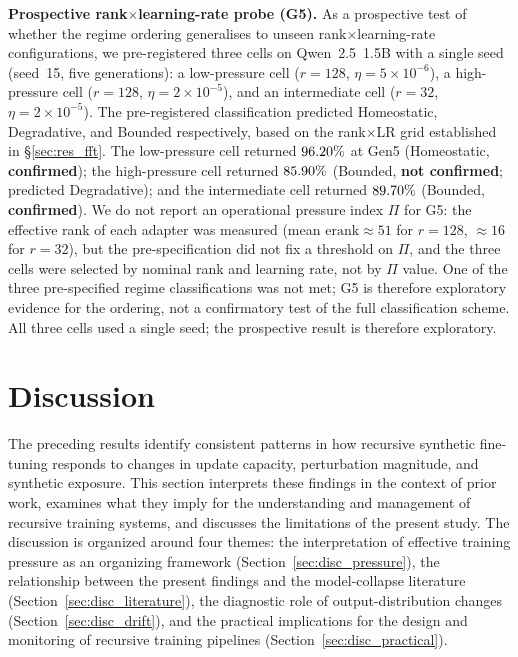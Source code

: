 \documentclass[a4paper,fleqn]{cas-dc}
\newif\ifshowchanges
\newcommand{\rev}[1]{\ifshowchanges{\color{blue}#1}\else{#1}\fi}
\begin{document}
\rev{\textbf{Prospective rank$\times$learning-rate probe (G5).}
As a prospective test of whether the regime ordering generalises to unseen
rank$\times$learning-rate configurations, we pre-registered three cells on
Qwen~2.5~1.5B with a single seed (seed~15, five generations): a low-pressure
cell ($r=128$, $\eta=5\times10^{-6}$), a high-pressure cell ($r=128$,
$\eta=2\times10^{-5}$), and an intermediate cell ($r=32$, $\eta=2\times10^{-5}$).
The pre-registered classification predicted Homeostatic, Degradative, and
Bounded respectively, based on the rank$\times$LR grid established in
\S\ref{sec:res_fft}.
The low-pressure cell returned $96.20\%$ at Gen5
(Homeostatic, \textbf{confirmed}); the high-pressure cell returned
$85.90\%$ (Bounded, \textbf{not confirmed}; predicted
Degradative); and the intermediate cell returned $89.70\%$
(Bounded, \textbf{confirmed}).
We do not report an operational pressure index $\Pi$ for G5: the effective rank
of each adapter was measured (mean $\mathrm{erank}\approx51$ for $r=128$,
$\approx16$ for $r=32$), but the pre-specification did not fix a threshold on
$\Pi$, and the three cells were selected by nominal rank and learning rate, not
by $\Pi$ value. One of the three pre-specified regime classifications was not
met; G5 is therefore exploratory evidence for the ordering, not a confirmatory
test of the full classification scheme.
All three cells used a single seed; the prospective result is therefore exploratory.}
\section{Discussion}\label{sec:discussion}

The preceding results identify consistent patterns in how recursive synthetic
fine-tuning responds to changes in update capacity, perturbation magnitude, and
synthetic exposure. This section interprets these findings in the context of
prior work, examines what they imply for the understanding and management of
recursive training systems, and discusses the limitations of the present study.
The discussion is organized around four themes: the interpretation of effective
training pressure as an organizing framework
(Section~\ref{sec:disc_pressure}), the relationship between the present findings
and the model-collapse literature (Section~\ref{sec:disc_literature}), the
diagnostic role of output-distribution changes (Section~\ref{sec:disc_drift}),
and the practical implications for the design and monitoring of recursive
training pipelines (Section~\ref{sec:disc_practical}).
\end{document}
